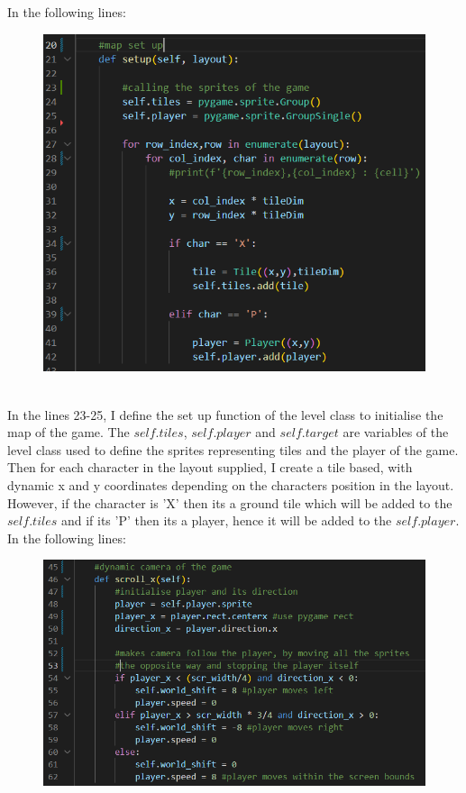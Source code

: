 \documentclass[12pt]{article}
\begin{document}
In the following lines:\\
\begin{figure}[H]
    \includegraphics[width = 12cm]{Level class/lonesetup.png}
    \centering
\end{figure}\\
In the lines 23-25, I define the set up function of the level class to initialise the map of the game. The $self.tiles$, $self.player$ and $self.target$ are variables of the level class used to define the sprites representing tiles and the player of the game. Then for each character in the layout supplied, I create a tile based, with dynamic x and y coordinates depending on the characters position in the layout. However, if the character is 'X' then its a ground tile which will be added to the $self.tiles$ and if its 'P' then its a player, hence it will be added to the $self.player$.\\
\newpage
In the following lines:\\
\begin{figure}[H]
    \includegraphics[width = 14cm]{Level class/scroll.png}
    \centering
\end{figure}\\
\end{document}
